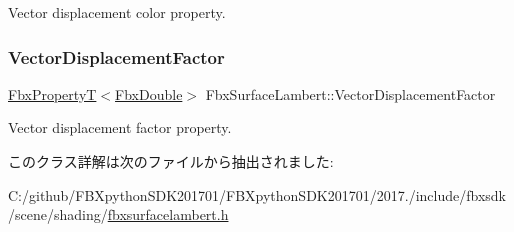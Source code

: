 Vector displacement color property. 

\mbox{\label{class_fbx_surface_lambert_aaf322b932e6f2213e13b5b88ba5a0ff9}} 
\subsubsection{\texorpdfstring{Vector\+Displacement\+Factor}{VectorDisplacementFactor}}
{\footnotesize\ttfamily \hyperlink{class_fbx_property_t}{Fbx\+PropertyT}$<$\hyperlink{fbxtypes_8h_a171e72a1c46fc15c1a6c9c31948c1c5b}{Fbx\+Double}$>$ Fbx\+Surface\+Lambert\+::\+Vector\+Displacement\+Factor}



Vector displacement factor property. 



このクラス詳解は次のファイルから抽出されました\+:\begin{DoxyCompactItemize}
\item 
C\+:/github/\+F\+B\+Xpython\+S\+D\+K201701/\+F\+B\+Xpython\+S\+D\+K201701/2017./include/fbxsdk/scene/shading/\hyperlink{fbxsurfacelambert_8h}{fbxsurfacelambert.\+h}\end{DoxyCompactItemize}
